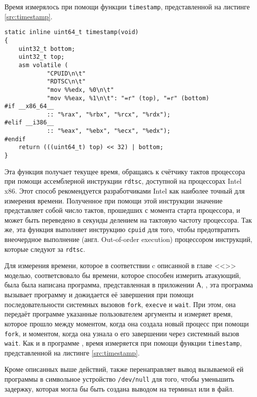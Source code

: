 Время измерялось при помощи функции \texttt{timestamp}, представленной на листинге
\ref{src:timestamp}.

\nopagebreak

\begin{lstlisting}[caption=Функция \texttt{timestamp}, label=src:timestamp]
static inline uint64_t timestamp(void)
{
	uint32_t bottom;
	uint32_t top;
	asm volatile (
			"CPUID\n\t"
			"RDTSC\n\t"
			"mov %%edx, %0\n\t"
			"mov %%eax, %1\n\t": "=r" (top), "=r" (bottom)
#if __x86_64__
			:: "%rax", "%rbx", "%rcx", "%rdx");
#elif __i386__
			:: "%eax", "%ebx", "%ecx", "%edx");
#endif
	return (((uint64_t) top) << 32) | bottom;
}
\end{lstlisting}

Эта функция получает текущее время, обращаясь к счётчику тактов процессора при
помощи ассемблерной инструкции \texttt{rdtsc}, доступной на процессорах Intel
x86. Этот способ рекомендуется разработчиками Intel \cite{rdtsc} как наиболее
точный для измерения времени. Полученное при помощи этой инструкции значение
представляет собой число тактов, прошедших с момента старта процессора, и
может быть переведено в секунды делением на тактовую частоту процессора. Так же,
эта функция выполняет инструкцию \texttt{cpuid} для того, чтобы предотвратить
внеочердное выполнение (англ. Out-of-order execution) процессором инструкций,
которые следуют за \texttt{rdtsc}.

Для измерения времени, которое в соответствии c описанной в главе
<<>> моделью, соответсвовало бы времени, которое способен
измерить атакующий, была была написана программа, представленная в приложении А,
, эта программа вызывает программу 
и дожидается её завершения при помощи последовательности системных вызовов
\texttt{fork}, \texttt{execve} и \texttt{wait}. При этом, она передаёт программе
 указанные пользователем аргументы и измеряет время, которое
прошло между моментом, когда она создала новый процесс при помощи \texttt{fork},
и моментом, когда она узнала о его завершении через системный вызов
\texttt{wait}. Как и в программе , время измеряется при помощи
функции \texttt{timestamp}, представленной на листинге \ref{src:timestamp}.

Кроме описанных выше действий,  также перенаправляет
вывод вызываемой ей программы в символьное устройство \texttt{/dev/null} для
того, чтобы уменьшить задержку, которая могла бы быть создана выводом на терминал
или в файл.

